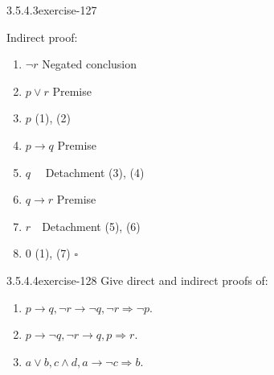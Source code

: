 \documentclass[twoside,10pt,]{book}
\numberwithin{equation}{section}
\begin{document}
\begin{divisionsolution}{3.5.4.3}{}{exercise-127}
\begin{enumerate}[label=(\alph*)]
\hypertarget{p-1208}{}%
Indirect proof:%
\par
\hypertarget{p-1209}{}%
%
\begin{enumerate}[label=(\arabic*)]
\item\hypertarget{li-686}{}\hypertarget{p-1210}{}%
\(\neg r\) Negated conclusion%
\item\hypertarget{li-687}{}\hypertarget{p-1211}{}%
\(p\lor r\) Premise%
\item\hypertarget{li-688}{}\hypertarget{p-1212}{}%
\(p\)   (1), (2)%
\item\hypertarget{li-689}{}\hypertarget{p-1213}{}%
\(p\to q\) Premise%
\item\hypertarget{li-690}{}\hypertarget{p-1214}{}%
\(q \quad \)  Detachment (3), (4)%
\item\hypertarget{li-691}{}\hypertarget{p-1215}{}%
\(q\to r\)  Premise%
\item\hypertarget{li-692}{}\hypertarget{p-1216}{}%
\(r \quad \)Detachment (5), (6)%
\item\hypertarget{li-693}{}\hypertarget{p-1217}{}%
0   (1), (7) \(\square\)%
\end{enumerate}
%
\end{enumerate}
%
\end{divisionsolution}%
\begin{divisionsolution}{3.5.4.4}{}{exercise-128}%
\hypertarget{p-1218}{}%
Give direct and indirect proofs of:%
\par
\hypertarget{p-1219}{}%
\leavevmode%
\begin{enumerate}[label=(\alph*)]
\item\hypertarget{li-694}{}\hypertarget{p-1220}{}%
\(p\rightarrow  q, \neg r\rightarrow  \neg q, \neg r \Rightarrow  \neg p\).%
\item\hypertarget{li-695}{}\hypertarget{p-1221}{}%
\(p\rightarrow  \neg q, \neg r\rightarrow  q, p \Rightarrow  r\).%
\item\hypertarget{li-696}{}\hypertarget{p-1222}{}%
\(a \lor  b, c \land  d, a \rightarrow  \neg c \Rightarrow  b\).%
\end{enumerate}
%
\end{divisionsolution}%
\end{document}
